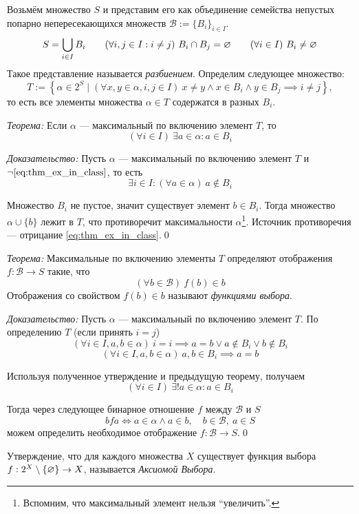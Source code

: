 \newcommand\B{\mathcal B}
Возьмём множество $S$ и представим его как объединение семейства непустых
попарно непересекающихся множеств $\B:=\{B_{i}\}_{i\in I}$.
\[
  S=\bigcup_{i\in I}B_{i}\qquad
  (\forall i,j\in I:i\neq j)~B_{i}\cap B_{j}=\varnothing\qquad
  (\forall i\in I)~B_{i}\neq\varnothing
\]
Такое представление называется {\it разбиением}.
Определим следующее множество:
\[
  T:=\left\{\alpha\in 2^{S}\;\big|\; (\forall x,y\in\alpha,i,j\in I)~
  x\neq y\land	x\in B_{i}\land y\in B_{j}\implies i\neq j\right\},
\]
то есть все элементы множества $\alpha\in T$ содержатся в разных $B_{i}$.

\vspace{1em}
{\it Теорема:} Если $\alpha$ --- максимальный по включению элемент $T$, то
\begin{equation}\label{eq:thm_ex_in_class}
  (\forall i\in I)~\exists a\in\alpha:a\in B_{i}
\end{equation}

{\it Доказательство:}
Пусть $\alpha$ --- максимальный по включению элемент $T$ и
$\lnot\eqref{eq:thm_ex_in_class}$, то есть
\[
  \exists i\in I:(\forall a\in\alpha)~a\notin B_{i}
\]

Множество $B_{i}$ не пустое, значит существует элемент $b\in B_{i}$.
Тогда множество $\alpha\cup \{b\}$ лежит в $T$, что противоречит
максимальности $\alpha$\footnote{Вспомним, что максимальный элемент
  нельзя ``увеличить''.}.
Источник противоречия --- отрицание \eqref{eq:thm_ex_in_class}.\qed

\vspace{1em}
{\it Теорема:} Максимальные по включению элементы $T$ определяют
отображения $f:\B\to S$ такие, что
\[
  (\forall b\in\B)~f(b)\in b
\]
Отображения со свойством $f(b)\in b$ называют {\it функциями выбора}.

{\it Доказательство:} Пусть $\alpha$ --- максимальный по включению
элемент $T$.
По определению $T$ (если принять $i=j$)
\[
  (\forall i\in I,a,b\in\alpha)~i=i\implies a=b\lor a\notin B_{i}\lor b\notin B_{i}
\]
\[
  (\forall i\in I,a,b\in\alpha)~a,b\in B_{i}\implies a=b
\]

Используя полученное утверждение и предыдущую теорему, получаем
\[
  (\forall i\in I)~\exists !a\in\alpha:a\in B_{i}
\]

Тогда через следующее бинарное отношение $f$ между $\B$ и $S$
\[
  bfa\iff a\in \alpha\land a\in b,\quad b\in\B,~a\in S
\]
можем определить необходимое отображение $f:\B\to S$.\qed

Утверждение, что для каждого множества $X$ существует функция
выбора $f:2^{X}\setminus\{\varnothing\}\to X$,
называется {\it Аксиомой Выбора}.

